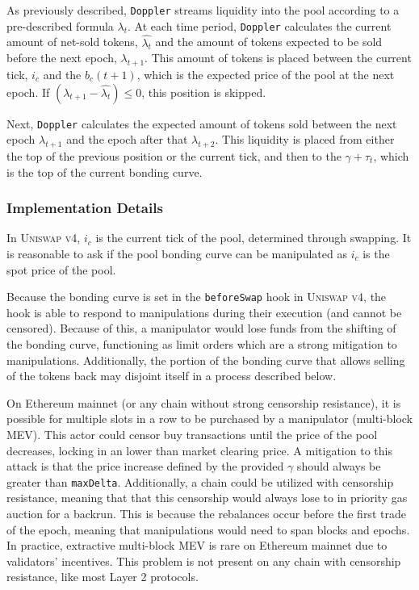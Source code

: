 \documentclass[sigconf,nonacm,prologue,table]{acmart}
\numberwithin{equation}{section}
\theoremstyle{definition}
\theoremstyle{remark}
\begin{document}
As previously described, \verb|Doppler| streams liquidity into the pool according to a pre-described formula $\lambda_t$. At each time period, \verb|Doppler| calculates the current amount of net-sold tokens, $\hat{\lambda_t}$ and the amount of tokens expected to be sold before the next epoch, $\lambda_{t+1}$. This amount of tokens is placed between the current tick, $i_c$ and the $b_c(t+1)$, which is the expected price of the pool at the next epoch. If $(\lambda_{t+1} - \hat{\lambda_t}) \leq 0$, this position is skipped.

Next, \verb|Doppler| calculates the expected amount of tokens sold between the next epoch $\lambda_{t+1}$ and the epoch after that $\lambda_{t+2}$. This liquidity is placed from either the top of the previous position or the current tick, and then to the $\gamma + \tau_t$, which is the top of the current bonding curve.

\subsubsection{Implementation Details} 

In \textsc{Uniswap v4}, $i_c$ is the current tick of the pool, determined through swapping. It is reasonable to ask if the pool bonding curve can be manipulated as $i_c$ is the spot price of the pool. 

Because the bonding curve is set in the \verb|beforeSwap| hook in \textsc{Uniswap v4}, the hook is able to respond to manipulations during their execution (and cannot be censored). Because of this, a manipulator would lose funds from the shifting of the bonding curve, functioning as limit orders which are a strong mitigation to manipulations. Additionally, the portion of the bonding curve that allows selling of the tokens back may disjoint itself in a process described below.

On Ethereum mainnet (or any chain without strong censorship resistance\cite{fox2023}), it is possible for multiple slots in a row to be purchased by a manipulator (multi-block MEV). This actor could censor buy transactions until the price of the pool decreases, locking in an  lower than market clearing price. A mitigation to this attack is that the price increase defined by the provided $\gamma$ should always be greater than \verb|maxDelta|. Additionally, a chain could be utilized with censorship resistance, meaning that that this censorship would always lose to in priority gas auction for a backrun. This is because the rebalances occur before the first trade of the epoch, meaning that manipulations would need to span blocks and epochs. In practice, extractive multi-block MEV is rare on Ethereum mainnet due to validators' incentives. This problem is not present on any chain with censorship resistance, like most Layer 2 protocols.
\end{document}
